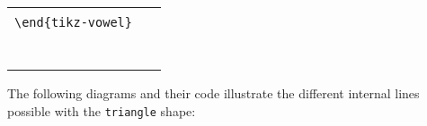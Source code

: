 \documentclass{article}
\begin{document}
\begin{center}
\begin{tabular}{ll}
  \begin{minipage}[t]{6.5cm}{\small
    \verb|\begin{tikz-vowel}[rectangle,three]|\\
    \verb|\end{tikz-vowel}|\\}
  \end{minipage} & 
  \begin{minipage}[t]{6.5cm}
  {~}
  \end{minipage} \\
  \begin{minipage}[t]{6.5cm}{
  \begin{tikz-vowel}\end{tikz-vowel} \\}\end{minipage} &
\end{tabular}
\end{center}

\noindent
The following diagrams and their code illustrate the different internal lines possible with the \texttt{triangle} shape:
\end{document}
